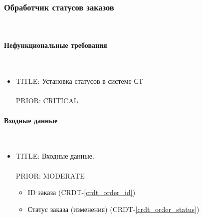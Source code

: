 \subsubsection{Обработчик статусов заказов} \mbox{} \\ \label{service_order_status_processing}
  
  \paragraph{Нефункциональные требования} \mbox{} \\

    \begin{itemize}

         \item {
           TITLE: Установка статусов в системе СТ\\
           \\
           PRIOR: CRITICAL\\
         }

         \end{itemize}

	\paragraph{Входные данные} \mbox{} \\ \label{}

      \begin{itemize}

        \item{

          TITLE: Входные данные.\\
          \\
          PRIOR: MODERATE\\

        }

          \begin{itemize}
            \item ID заказа (CRDT-\ref{crdt_order_id})
            \item Статус заказа (изменения) (CRDT-\ref{crdt_order_status})
          \end{itemize}

      \end{itemize}


